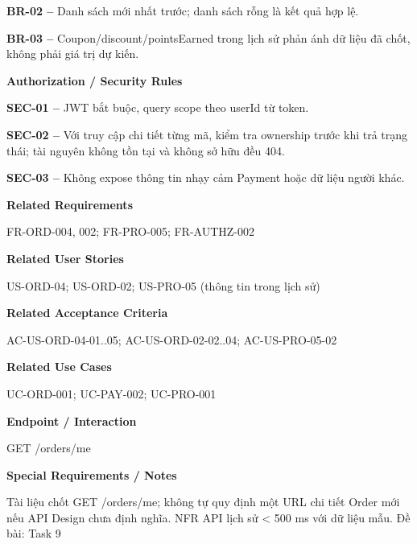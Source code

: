 \documentclass[11pt,a4paper,oneside]{report}
\begin{document}
\textbf{BR-02 --} Danh sách mới nhất trước; danh sách rỗng là kết quả hợp lệ.

\textbf{BR-03 --} Coupon/discount/pointsEarned trong lịch sử phản ánh dữ liệu đã chốt, không phải giá trị dự kiến.
\par

\par\smallskip\noindent\textcolor{sgublue}{\textbf{Authorization / Security Rules}}\par\nobreak
\textbf{SEC-01 --} JWT bắt buộc, query scope theo userId từ token.

\textbf{SEC-02 --} Với truy cập chi tiết từng mã, kiểm tra ownership trước khi trả trạng thái; tài nguyên không tồn tại và không sở hữu đều 404.

\textbf{SEC-03 --} Không expose thông tin nhạy cảm Payment hoặc dữ liệu người khác.
\par

\par\smallskip\noindent\textcolor{sgublue}{\textbf{Related Requirements}}\par\nobreak
FR-ORD-004, 002; FR-PRO-005; FR-AUTHZ-002
\par

\par\smallskip\noindent\textcolor{sgublue}{\textbf{Related User Stories}}\par\nobreak
US-ORD-04; US-ORD-02; US-PRO-05 (thông tin trong lịch sử)
\par

\par\smallskip\noindent\textcolor{sgublue}{\textbf{Related Acceptance Criteria}}\par\nobreak
AC-US-ORD-04-01..05; AC-US-ORD-02-02..04; AC-US-PRO-05-02
\par

\par\smallskip\noindent\textcolor{sgublue}{\textbf{Related Use Cases}}\par\nobreak
UC-ORD-001; UC-PAY-002; UC-PRO-001
\par

\par\smallskip\noindent\textcolor{sgublue}{\textbf{Endpoint / Interaction}}\par\nobreak
GET /orders/me
\par

\par\smallskip\noindent\textcolor{sgublue}{\textbf{Special Requirements / Notes}}\par\nobreak
Tài liệu chốt GET /orders/me; không tự quy định một URL chi tiết Order mới nếu API Design chưa định nghĩa. NFR API lịch sử \textless{} 500 ms với dữ liệu mẫu. \textbar{} Đề bài: Task 9
\par
\end{document}
